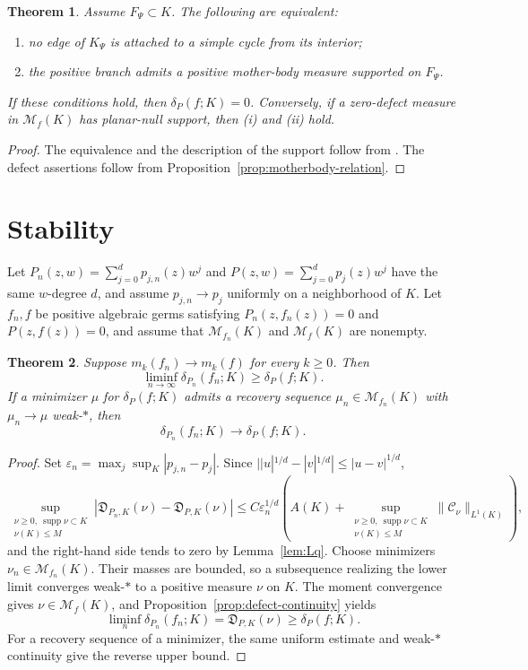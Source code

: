 \documentclass[reqno]{amsart}
\newtheorem{theorem}{Theorem}[section]
\theoremstyle{definition}
\theoremstyle{remark}
\newcommand{\M}{\mathcal M}
\newcommand{\Cauchy}{\mathcal C}
\newcommand{\supp}{\operatorname{supp}}
\begin{document}
\begin{theorem}\label{thm:strebel-zero}
Assume $F_\Psi\subset K$.  The following are equivalent:
\begin{enumerate}[label=\textup{(\roman*)}]
\item no edge of $K_\Psi$ is attached to a simple cycle from its interior;
\item the positive branch admits a positive mother-body measure supported on
$F_\Psi$.
\end{enumerate}
If these conditions hold, then $\delta_P(f;K)=0$.  Conversely, if a zero-defect
measure in $\M_f(K)$ has planar-null support, then \textup{(i)} and
\textup{(ii)} hold.
\end{theorem}

\begin{proof}
The equivalence and the description of the support follow from
\cite[Theorem~13 and Proposition~14]{BoSh}.  The defect assertions follow from
Proposition~\ref{prop:motherbody-relation}.
\end{proof}

\section{Stability}\label{sec:stability}

Let $P_n(z,w)=\sum_{j=0}^dp_{j,n}(z)w^j$ and
$P(z,w)=\sum_{j=0}^dp_j(z)w^j$ have the same $w$-degree $d$, and assume
$p_{j,n}\to p_j$ uniformly on a neighborhood of $K$.  Let $f_n,f$ be positive
algebraic germs satisfying $P_n(z,f_n(z))=0$ and $P(z,f(z))=0$, and assume that
$\M_{f_n}(K)$ and $\M_f(K)$ are nonempty.

\begin{theorem}\label{thm:stability}
Suppose $m_k(f_n)\to m_k(f)$ for every $k\ge0$.  Then
\[
 \liminf_{n\to\infty}\delta_{P_n}(f_n;K)\ge\delta_P(f;K).
\]
If a minimizer $\mu$ for $\delta_P(f;K)$ admits a recovery sequence
$\mu_n\in\M_{f_n}(K)$ with $\mu_n\to\mu$ weak-$*$, then
\[
 \delta_{P_n}(f_n;K)\longrightarrow\delta_P(f;K).
\]
\end{theorem}

\begin{proof}
Set
$\varepsilon_n=\max_j\sup_K|p_{j,n}-p_j|$.  Since
$||u|^{1/d}-|v|^{1/d}|\le|u-v|^{1/d}$,
\[
 \sup_{\substack{\nu\ge0,\ \supp\nu\subset K\\ \nu(K)\le M}}
 |\mathfrak D_{P_n,K}(\nu)-\mathfrak D_{P,K}(\nu)|
 \le C\varepsilon_n^{1/d}
 \left(A(K)+
 \sup_{\substack{\nu\ge0,\ \supp\nu\subset K\\ \nu(K)\le M}}
 \|\Cauchy_\nu\|_{L^1(K)}\right),
\]
and the right-hand side tends to zero by Lemma~\ref{lem:Lq}.  Choose minimizers
$\nu_n\in\M_{f_n}(K)$.  Their masses are bounded, so a subsequence realizing
the lower limit converges weak-$*$ to a positive measure $\nu$ on $K$.  The
moment convergence gives $\nu\in\M_f(K)$, and
Proposition~\ref{prop:defect-continuity} yields
\[
 \liminf_n\delta_{P_n}(f_n;K)
 =\mathfrak D_{P,K}(\nu)\ge\delta_P(f;K).
\]
For a recovery sequence of a minimizer, the same uniform estimate and weak-$*$
continuity give the reverse upper bound.
\end{proof}
\end{document}
